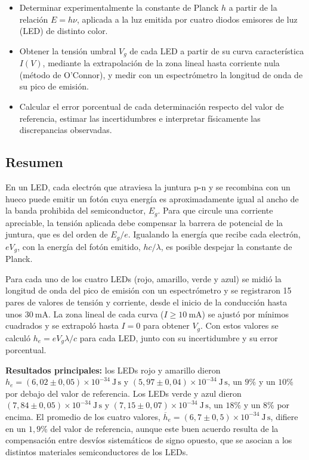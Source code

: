 \documentclass{article}
\newcommand{\Js}{\ \mathrm{J\,s}}
\begin{document}
\begin{itemize}
    \item Determinar experimentalmente la constante de Planck $h$ a partir de la relación $E=h\nu$, aplicada a la luz emitida por cuatro diodos emisores de luz (LED) de distinto color.
    \item Obtener la tensión umbral $V_g$ de cada LED a partir de su curva característica $I(V)$, mediante la extrapolación de la zona lineal hasta corriente nula (método de O'Connor), y medir con un espectrómetro la longitud de onda de su pico de emisión.
    \item Calcular el error porcentual de cada determinación respecto del valor de referencia, estimar las incertidumbres e interpretar físicamente las discrepancias observadas.
\end{itemize}

\subsection{Resumen}

En un LED, cada electrón que atraviesa la juntura p-n y se recombina con un hueco puede emitir un fotón cuya energía es aproximadamente igual al ancho de la banda prohibida del semiconductor, $E_g$. Para que circule una corriente apreciable, la tensión aplicada debe compensar la barrera de potencial de la juntura, que es del orden de $E_g/e$. Igualando la energía que recibe cada electrón, $eV_g$, con la energía del fotón emitido, $hc/\lambda$, es posible despejar la constante de Planck.

Para cada uno de los cuatro LEDs (rojo, amarillo, verde y azul) se midió la longitud de onda del pico de emisión con un espectrómetro y se registraron 15 pares de valores de tensión y corriente, desde el inicio de la conducción hasta unos $30\ \mathrm{mA}$. La zona lineal de cada curva ($I\geq10\ \mathrm{mA}$) se ajustó por mínimos cuadrados y se extrapoló hasta $I=0$ para obtener $V_g$. Con estos valores se calculó $h_e=eV_g\lambda/c$ para cada LED, junto con su incertidumbre y su error porcentual.

\textbf{Resultados principales:} los LEDs rojo y amarillo dieron $h_e=(6,02\pm0,05)\times10^{-34}\Js$ y $(5,97\pm0,04)\times10^{-34}\Js$, un $9\%$ y un $10\%$ por debajo del valor de referencia. Los LEDs verde y azul dieron $(7,84\pm0,05)\times10^{-34}\Js$ y $(7,15\pm0,07)\times10^{-34}\Js$, un $18\%$ y un $8\%$ por encima. El promedio de los cuatro valores, $\overline{h}_e=(6,7\pm0,5)\times10^{-34}\Js$, difiere en un $1,9\%$ del valor de referencia, aunque este buen acuerdo resulta de la compensación entre desvíos sistemáticos de signo opuesto, que se asocian a los distintos materiales semiconductores de los LEDs.
\end{document}
